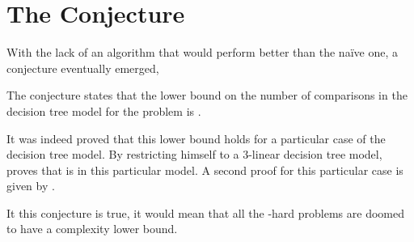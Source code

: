 \section{The Conjecture}

With the lack of an algorithm that would perform better than the naïve
 one, a conjecture eventually emerged,

\begin{conjecture}
The \threeSUM conjecture states that the lower bound on the number of
comparisons in the decision tree model for the \threeSUM problem
is .
\end{conjecture}

It was indeed proved that this lower bound holds for a particular case of the
decision tree model. By restricting himself to a $3$-linear decision tree
model, \citet{erickson:1999} proves that \threeSUM is  in this
particular model. A second proof for this particular case is given by
\citet{ailon:2005}.

It this conjecture is true, it would mean that all the \threeSUM-hard
problems are doomed to have a  complexity lower bound.
